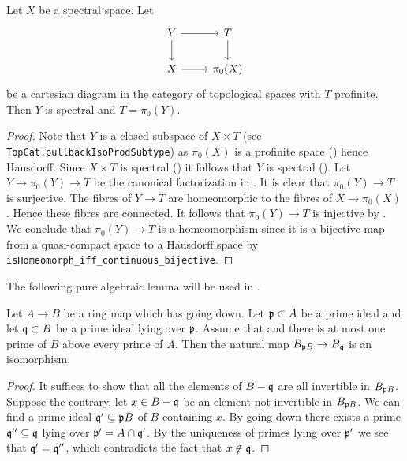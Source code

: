 \begin{lemma}
Let $X$ be a spectral space. Let
\[
\begin{tikzcd}
Y \arrow[r] \arrow[d] & T \arrow[d] \\
X \arrow[r] & \pi_0(X)
\end{tikzcd}
\]
be a cartesian diagram in the category of topological spaces with $T$ profinite. Then $Y$ is spectral and $T = \pi_0(Y)$.
\label{thm:cartesian-profinite}
\end{lemma}

\begin{proof}
  Note that $Y$ is a closed subspace of $X \times T$ (see \verb`TopCat.pullbackIsoProdSubtype`) as $\pi_0(X)$ is a profinite space () hence Hausdorff. Since $X \times T$ is spectral () it follows that $Y$ is spectral (). Let $Y \to \pi_0(Y) \to T$ be the canonical factorization in . It is clear that $\pi_0(Y) \to T$ is surjective. The fibres of $Y \to T$ are homeomorphic to the fibres of $X \to \pi_0(X)$. Hence these fibres are connected. It follows that $\pi_0(Y) \to T$ is injective by . We conclude that $\pi_0(Y) \to T$ is a homeomorphism since it is a bijective map from a quasi-compact space to a Hausdorff space by \verb`isHomeomorph_iff_continuous_bijective`.
\end{proof}

The following pure algebraic lemma will be used in .

\begin{lemma}
  \label{thm:localization-isom-of-going-down}
  Let $A \to B$ be a ring map which has going down. Let ${\mathfrak{p}} \subset A$ be a prime ideal and let ${\mathfrak{q}} \subset B$ be a prime ideal lying over ${\mathfrak{p}}$. Assume that and there is at most one prime of $B$ above every prime of $A$. Then the natural map $B_{{\mathfrak{p}} B} \to B_{{\mathfrak{q}}}$ is an isomorphism.
\end{lemma}

\begin{proof}
  It suffices to show that all the elements of $B - {\mathfrak{q}}$ are all invertible in $B_{{\mathfrak{p}} B}$. Suppose the contrary, let $x \in B - {\mathfrak{q}}$ be an element not invertible in $B_{{\mathfrak{p}} B}$. We can find a prime ideal ${\mathfrak{q}}' \subseteq {\mathfrak{p}} B$ of $B$ containing $x$. By going down there exists a prime ${\mathfrak{q}}'' \subseteq {\mathfrak{q}}$ lying over ${\mathfrak{p}}' = A \cap {\mathfrak{q}}'$. By the uniqueness of primes lying over ${\mathfrak{p}}'$ we see that ${\mathfrak{q}}' = {\mathfrak{q}}''$, which contradicts the fact that $x \notin {\mathfrak{q}}$.
\end{proof}

